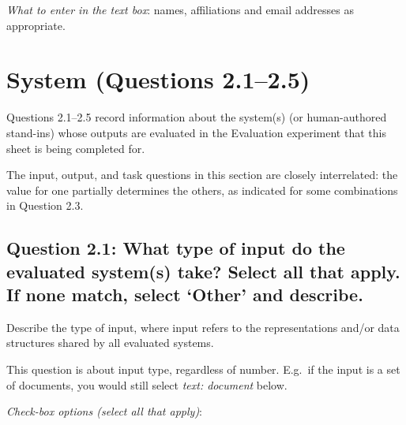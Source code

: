 \documentclass[11pt,a4paper]{article}
\begin{document}
\noindent\textit{What to enter in the text box}: names, affiliations and email addresses as appropriate. 



\section{System (Questions 2.1--2.5)}\label{sec:system}

Questions 2.1--2.5 record information about the system(s) (or human-authored stand-ins) whose outputs are evaluated in the Evaluation experiment that this sheet is being completed for.

The input, output, and task questions in this section are closely interrelated: the value for one partially determines the others, as indicated for some combinations in Question 2.3. 


\vspace{-.3cm}
\subsection*{Question 2.1: What type of input do the evaluated system(s) take? Select all that apply. If none match, select `Other' and describe.}\label{sec:input}
\vspace{-.1cm}

Describe the type of input, where input refers to the representations and/or data structures shared by all evaluated systems. 

This question is about input type, regardless of number. E.g.\ if the input is a set of documents, you would still select \textit{text: document} below. 

\vspace{.3cm}
\noindent\textit{Check-box options (select all that apply)}: 
\vspace{-.1cm}
\end{document}
